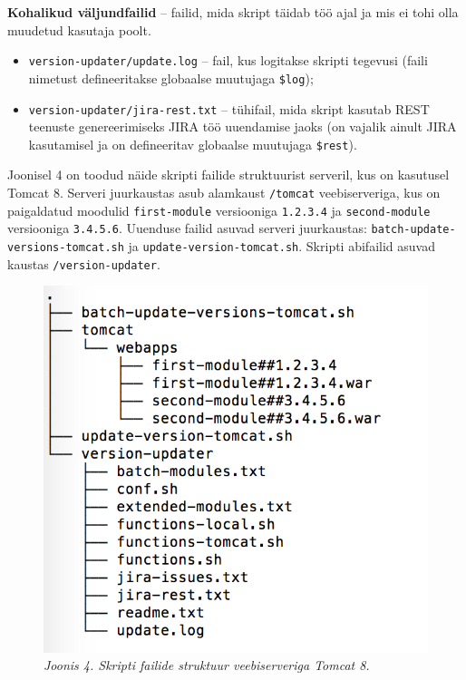 \documentclass[12pt]{report}
\newcommand{\code}[1]{\texttt{#1}}
\begin{document}
  \textbf{Kohalikud väljundfailid} \--- failid, mida skript täidab töö ajal ja mis ei tohi olla muudetud kasutaja poolt.
  
  \begin{itemize}
    \item \code{version-updater/update.log} \--- fail, kus logitakse skripti tegevusi (faili nimetust defineeritakse globaalse muutujaga \code{\$log});
    \item \code{version-updater/jira-rest.txt} \--- tühifail, mida skript kasutab REST \cite{rest} teenuste genereerimiseks JIRA töö uuendamise \cite{jira} jaoks (on vajalik ainult JIRA kasutamisel ja on defineeritav globaalse muutujaga \code{\$rest}).
  \end{itemize}
  
  \newpage
  
  Joonisel 4 on toodud näide skripti failide struktuurist serveril, kus on kasutusel Tomcat 8. Serveri juurkaustas asub alamkaust \code{/tomcat} veebiserveriga, kus on paigaldatud moodulid \code{first-module} versiooniga \code{1.2.3.4} ja \code{second-module} versiooniga \code{3.4.5.6}. Uuenduse failid asuvad serveri juurkaustas: \code{batch-update-versions-tomcat.sh} ja \code{update-version-tomcat.sh}. Skripti abifailid asuvad kaustas \code{/version-updater}.
  
  \begin{figure}[H] 
    \begin{center}
      \includegraphics{screenshots/file-structure-on-tomcat.png}
      \caption*{\textit{Joonis 4. Skripti failide struktuur veebiserveriga Tomcat 8.}}
      \end{center}
   \end{figure}
   
\end{document}
